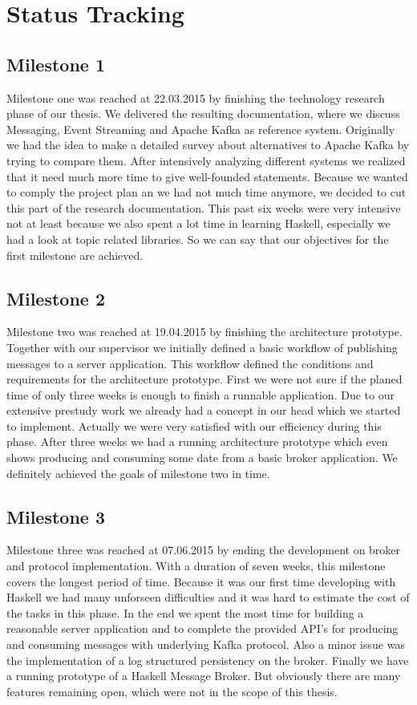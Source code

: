 \section{Status Tracking}
\label{sec:status-tracking}

\subsection{Milestone 1}
Milestone one was reached at 22.03.2015 by finishing the technology research
phase of our thesis. We delivered the resulting documentation, where we discuss
Messaging, Event Streaming and Apache Kafka as reference system. Originally we
had the idea to make a detailed survey about alternatives to Apache Kafka by
trying to compare them. After intensively analyzing different systems we
realized that it need much more time to give well-founded statements. Because we
wanted to comply the project plan an we had not much time anymore, we decided to
cut this part of the research documentation. This past six weeks were very
intensive not at least because we also spent a lot time in learning Haskell,
especially we had a look at topic related libraries. So we can say that our
objectives for the first milestone are achieved.

\subsection{Milestone 2}
Milestone two was reached at 19.04.2015 by finishing the architecture prototype.
Together with our supervisor we initially defined a basic workflow of publishing
messages to a server application. This workflow defined the conditions and
requirements for the architecture prototype. First we were not sure if the
planed time of only three weeks is enough to finish a runnable application. Due
to our extensive prestudy work we already had a concept in our head which we
started to implement. Actually we were very satisfied with our efficiency during
this phase. After three weeks we had a running architecture prototype which even
shows producing and consuming some date from a basic broker application. We
definitely achieved the goals of milestone two in time. 

\subsection{Milestone 3} 
Milestone three was reached at 07.06.2015 by ending the
development on broker and protocol implementation. With a duration of seven
weeks, this milestone covers the longest period of time. Because it was our
first time developing with Haskell we had many unforseen difficulties and it was
hard to estimate the cost of the tasks in this phase. In the end we spent the
most time for building a reasonable server application and to complete the
provided API's for producing and consuming messages with underlying Kafka
protocol. Also a minor issue was the implementation of a log structured
persistency on the broker. Finally we have a running prototype of a Haskell
Message Broker. But obviously there are many features remaining open, which were
not in the scope of this thesis. 

